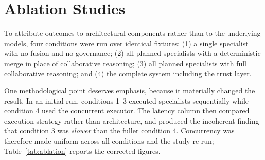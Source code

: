 \documentclass[preprint,12pt]{elsarticle}
\begin{document}
\section{Ablation Studies}
\label{sec:ablation}

To attribute outcomes to architectural components rather than to the
underlying models, four conditions were run over identical fixtures:
(1) a single specialist with no fusion and no governance; (2) all planned
specialists with a deterministic merge in place of collaborative reasoning;
(3) all planned specialists with full collaborative reasoning; and (4) the
complete system including the trust layer.

One methodological point deserves emphasis, because it materially changed
the result. In an initial run, conditions 1--3 executed specialists
sequentially while condition 4 used the concurrent executor. The latency
column then compared execution strategy rather than architecture, and
produced the incoherent finding that condition 3 was \emph{slower} than the
fuller condition 4. Concurrency was therefore made uniform across all
conditions and the study re-run; Table~\ref{tab:ablation} reports the
corrected figures.

\begin{table}[H]
\centering
\caption{Ablation across four architectural conditions on identical fixtures, all four now run on the full $N=105$ benchmark used throughout this paper. An earlier version of this study reported the ablation on an archived ten-scenario ($N=10$) run predating the dataset expansion; this table replaces it and is internally consistent with Table~\ref{tab:overall}. Mean specialists run counts specialist agents that actually completed per scenario (out of five), averaged over the benchmark; task success is omitted here as every condition reached 100.0\% (Table~\ref{tab:overall}), which carries no discriminative information across conditions. Recommendation quality is LLM-judged and was evaluated for condition 4 only this round (see text); it is reported as not available (N/A) rather than estimated for conditions 1--3.}
\label{tab:ablation}
\end{table}
\end{document}
